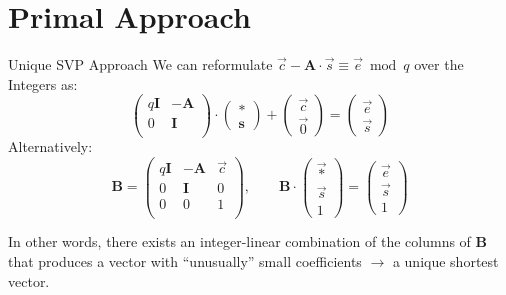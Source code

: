 \documentclass[xcolor=table,10pt,aspectratio=169]{beamer}
\begin{document}
\section{Primal Approach}
\label{sec:orga734c62}
\begin{frame}[label={sec:orge1309da}]{Unique SVP Approach}
We can reformulate \(\vec{c} - \mathbf{A} \cdot \vec{s} \equiv \vec{e} \bmod q\)  over the Integers as:
\[
  \begin{pmatrix}
    q\mathbf{I} & -\mathbf{A}\\
    0 & \mathbf{I}\\
  \end{pmatrix} \cdot
  \begin{pmatrix}
    \mathbf{*}\\
    \mathbf{s}
  \end{pmatrix} +
  \begin{pmatrix}
    \vec{c}\\
    \vec{0}
  \end{pmatrix} = 
  \begin{pmatrix}
    \vec{e}\\
    \vec{s}
  \end{pmatrix}
\]
Alternatively:
\[
  \mathbf{B} = \begin{pmatrix}
    q\mathbf{I} & -\mathbf{A} & \vec{c}\\
    0 & \mathbf{I} & 0\\
    0 & 0 & 1\\
  \end{pmatrix}, \qquad
  \mathbf{B} \cdot
  \begin{pmatrix}
    \vec{*}\\
    \vec{s}\\
    1
  \end{pmatrix} = 
  \begin{pmatrix}
    \vec{e}\\
    \vec{s}\\
    1
  \end{pmatrix}
\]

In other words, there exists an integer-linear combination of the columns of \(\mathbf{B}\) that produces a vector with “unusually” small coefficients \(\rightarrow\) a unique shortest vector.
\end{frame}
\end{document}
